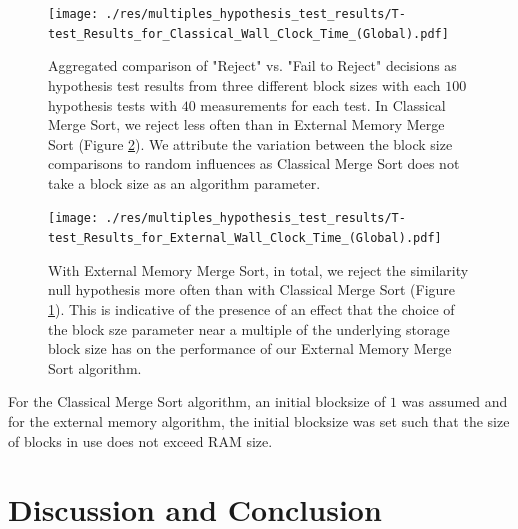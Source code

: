 \documentclass[twocolumn]{article}
\begin{document}
\begin{figure}[htb]
    \begin{minipage}{0.475 \textwidth}
        \centering
        \texttt{[image: ./res/multiples\_hypothesis\_test\_results/T-test\_Results\_for\_Classical\_Wall\_Clock\_Time\_(Global).pdf]}
        \caption{Aggregated comparison of "Reject" vs. "Fail to Reject" decisions as hypothesis test results from three different block sizes with each \( 100 \) hypothesis tests with \( 40 \) measurements for each test. In Classical Merge Sort, we reject less often than in External Memory Merge Sort (Figure \ref{fig:T-test_Results_for_External_Wall_Clock_Time_(Global).pdf}).
            We attribute the variation between the block size comparisons to random influences as Classical Merge Sort does not take a block size as an algorithm parameter.}
        \label{fig:T-test_Results_for_Classical_Wall_Clock_Time_(Global).pdf}
    \end{minipage}
\end{figure}

\begin{figure}[htb]
    \begin{minipage}{0.475 \textwidth}
        \centering
        \texttt{[image: ./res/multiples\_hypothesis\_test\_results/T-test\_Results\_for\_External\_Wall\_Clock\_Time\_(Global).pdf]}
        \caption{With External Memory Merge Sort, in total, we reject the similarity null hypothesis more often than with Classical Merge Sort (Figure \ref{fig:T-test_Results_for_Classical_Wall_Clock_Time_(Global).pdf}). This is indicative of the presence of an effect that the choice of the block sze parameter
            near a multiple of the underlying storage block size has on the performance of our External Memory Merge Sort algorithm.}
        \label{fig:T-test_Results_for_External_Wall_Clock_Time_(Global).pdf}
    \end{minipage}
\end{figure}

\begin{center}
\end{center}

For the Classical Merge Sort algorithm, an initial blocksize of \( 1 \) was assumed and for the external memory algorithm, the initial blocksize was set such that the size of blocks in use does not exceed RAM size.


\section{Discussion and Conclusion}
\end{document}
